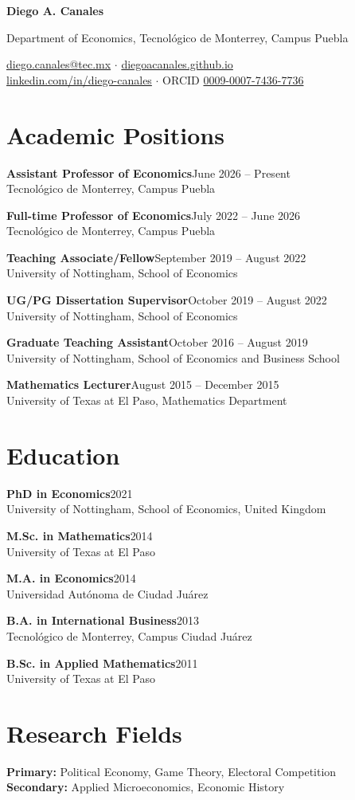 \documentclass[11pt]{article}
\newcommand{\entry}[3]{%
  \textbf{#1}\hfill #2\\
  #3\par\vspace{0.8ex}}
\begin{document}
{\LARGE\bfseries Diego A. Canales}\par\vspace{0.6ex}
Department of Economics, Tecnológico de Monterrey, Campus Puebla\par
\href{mailto:diego.canales@tec.mx}{diego.canales@tec.mx} \;$\cdot$\;
\href{https://diegoacanales.github.io}{diegoacanales.github.io}\\
\href{https://www.linkedin.com/in/diego-canales/}{linkedin.com/in/diego-canales} \;$\cdot$\;
ORCID \href{https://orcid.org/0009-0007-7436-7736}{0009-0007-7436-7736}\par

\section{Academic Positions}
\entry{Assistant Professor of Economics}{June 2026 -- Present}{Tecnológico de Monterrey, Campus Puebla}
\entry{Full-time Professor of Economics}{July 2022 -- June 2026}{Tecnológico de Monterrey, Campus Puebla}
\entry{Teaching Associate/Fellow}{September 2019 -- August 2022}{University of Nottingham, School of Economics}
\entry{UG/PG Dissertation Supervisor}{October 2019 -- August 2022}{University of Nottingham, School of Economics}
\entry{Graduate Teaching Assistant}{October 2016 -- August 2019}{University of Nottingham, School of Economics and Business School}
\entry{Mathematics Lecturer}{August 2015 -- December 2015}{University of Texas at El Paso, Mathematics Department}

\section{Education}
\entry{PhD in Economics}{2021}{University of Nottingham, School of Economics, United Kingdom}
\entry{M.Sc. in Mathematics}{2014}{University of Texas at El Paso}
\entry{M.A. in Economics}{2014}{Universidad Autónoma de Ciudad Juárez}
\entry{B.A. in International Business}{2013}{Tecnológico de Monterrey, Campus Ciudad Juárez}
\entry{B.Sc. in Applied Mathematics}{2011}{University of Texas at El Paso}

\section{Research Fields}
\textbf{Primary:} Political Economy, Game Theory, Electoral Competition\\
\textbf{Secondary:} Applied Microeconomics, Economic History
\end{document}

